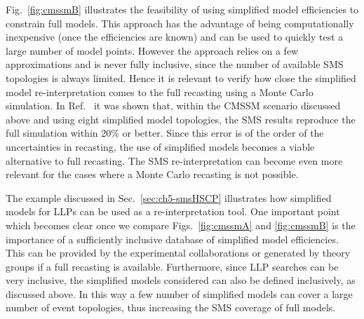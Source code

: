 Fig.~\ref{fig:cmssmB} illustrates the feasibility of using simplified
model efficiencies to constrain full models.
This approach has the advantage of being computationally inexpensive
(once the efficiencies are known) and can be used to quickly test
a large number of model points. However the approach relies on a few
approximations and is never fully inclusive, since the number of available SMS topologies is always limited.
Hence it is relevant to verify
how close the simplified model re-interpretation comes to the full recasting
using a Monte Carlo simulation.
In Ref.~\cite{Heisig:2015yla} it was shown that, within
the CMSSM scenario discussed above and using eight simplified model
topologies, the SMS results reproduce the full simulation within
20\% or better.
Since this error is of the order of the uncertainties in recasting,
the use of simplified models becomes a viable alternative to full recasting.
The SMS re-interpretation can become even more relevant for the cases
where a Monte Carlo recasting is not possible.


\vskip 0.1in
\vskip 0.1in

The example discussed in Sec.~\ref{sec:ch5-smsHSCP} illustrates
how simplified models for LLPs can be used as a re-interpretation tool.
One important point which becomes clear once we compare Figs.~\ref{fig:cmssmA}
and \ref{fig:cmssmB} is the importance of a sufficiently inclusive database
of simplified model efficiencies. This can be provided by the experimental
collaborations or generated by theory groups if a full recasting is available.
Furthermore, since LLP searches can be very inclusive,
the simplified models considered can also be defined
inclusively, as discussed above.
In this way a few number of simplified models can cover
a large number of event topologies, thus increasing the SMS coverage
of full models.



